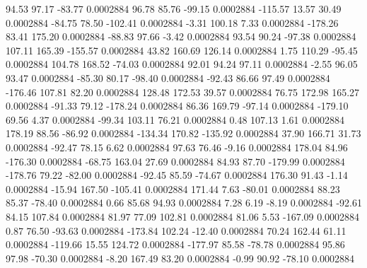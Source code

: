        94.53       97.17      -83.77     0.0002884
       96.78       85.76      -99.15     0.0002884
     -115.57       13.57       30.49     0.0002884
      -84.75       78.50     -102.41     0.0002884
       -3.31      100.18        7.33     0.0002884
     -178.26       83.41      175.20     0.0002884
      -88.83       97.66       -3.42     0.0002884
       93.54       90.24      -97.38     0.0002884
      107.11      165.39     -155.57     0.0002884
       43.82      160.69      126.14     0.0002884
        1.75      110.29      -95.45     0.0002884
      104.78      168.52      -74.03     0.0002884
       92.01       94.24       97.11     0.0002884
       -2.55       96.05       93.47     0.0002884
      -85.30       80.17      -98.40     0.0002884
      -92.43       86.66       97.49     0.0002884
     -176.46      107.81       82.20     0.0002884
      128.48      172.53       39.57     0.0002884
       76.75      172.98      165.27     0.0002884
      -91.33       79.12     -178.24     0.0002884
       86.36      169.79      -97.14     0.0002884
     -179.10       69.56        4.37     0.0002884
      -99.34      103.11       76.21     0.0002884
        0.48      107.13        1.61     0.0002884
      178.19       88.56      -86.92     0.0002884
     -134.34      170.82     -135.92     0.0002884
       37.90      166.71       31.73     0.0002884
      -92.47       78.15        6.62     0.0002884
       97.63       76.46       -9.16     0.0002884
      178.04       84.96     -176.30     0.0002884
      -68.75      163.04       27.69     0.0002884
       84.93       87.70     -179.99     0.0002884
     -178.76       79.22      -82.00     0.0002884
      -92.45       85.59      -74.67     0.0002884
      176.30       91.43       -1.14     0.0002884
      -15.94      167.50     -105.41     0.0002884
      171.44        7.63      -80.01     0.0002884
       88.23       85.37      -78.40     0.0002884
        0.66       85.68       94.93     0.0002884
        7.28        6.19       -8.19     0.0002884
      -92.61       84.15      107.84     0.0002884
       81.97       77.09      102.81     0.0002884
       81.06        5.53     -167.09     0.0002884
        0.87       76.50      -93.63     0.0002884
     -173.84      102.24      -12.40     0.0002884
       70.24      162.44       61.11     0.0002884
     -119.66       15.55      124.72     0.0002884
     -177.97       85.58      -78.78     0.0002884
       95.86       97.98      -70.30     0.0002884
       -8.20      167.49       83.20     0.0002884
       -0.99       90.92      -78.10     0.0002884

